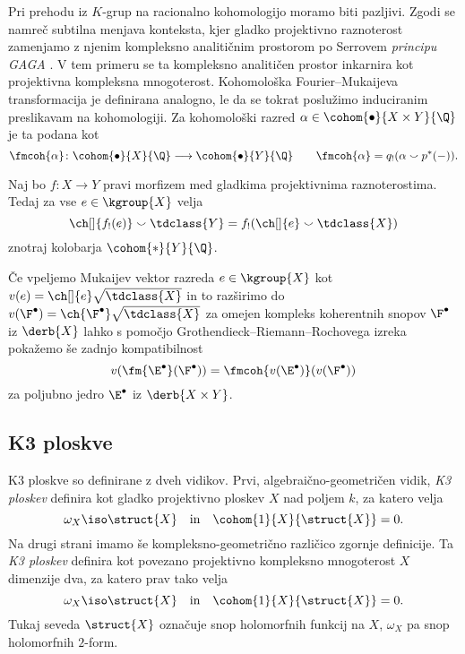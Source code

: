 Pri prehodu iz $K$-grup na racionalno kohomologijo moramo biti pazljivi. Zgodi se namreč subtilna menjava konteksta, kjer gladko projektivno raznoterost zamenjamo z njenim kompleksno analitičnim prostorom po Serrovem \emph{principu GAGA} \cite{Serre1956}. V tem primeru se ta kompleksno analitičen prostor inkarnira kot projektivna kompleksna mnogoterost. Kohomološka Fourier--Mukaijeva transformacija je definirana analogno, le da se tokrat poslužimo induciranim preslikavam na kohomologiji. Za kohomološki razred $\alpha \in \cohom{\bullet}{X \times Y}{\Q}$ je ta podana kot
\[
    \fmcoh{\alpha} \colon \cohom{\bullet}{X}{\Q} \longrightarrow \cohom{\bullet}{Y}{\Q} \qquad \fmcoh{\alpha} = q_!(\alpha \smallsmile p^*(-)).
\]

\begin{izrek}
    Naj bo $f \colon X \to Y$ pravi morfizem med gladkima projektivnima raznoterostima. Tedaj za vse $e \in \kgroup{X}$ velja
    \begin{equation}
        \ch[]{f_!(e)} \smallsmile \tdclass{Y} = f_!(\ch[]{e} \smallsmile \tdclass{X})
    \end{equation}
    znotraj kolobarja $\cohom{*}{Y}{\Q}$.
\end{izrek}

Če vpeljemo Mukaijev vektor razreda $e \in \kgroup{X}$ kot $v(e) = \ch[]{e}\sqrt{\tdclass{X}}$ in to razširimo do $v(\F^\bullet) = \ch{\F^\bullet}\sqrt{\tdclass{X}}$ za omejen kompleks koherentnih snopov $\F^\bullet$ iz $\derb{X}$ lahko s pomočjo Grothendieck--Riemann--Rochovega izreka pokažemo še zadnjo kompatibilnost
\[
    v(\fm{\E^\bullet}(\F^\bullet)) = \fmcoh{v(\E^\bullet)}(v(\F^\bullet))
\]
za poljubno jedro $\E^\bullet$ iz $\derb{X \times Y}$.

\subsection*{K3 ploskve}

K3 ploskve so definirane z dveh vidikov. Prvi, algebraično-geometričen vidik, \emph{K3 ploskev} definira kot gladko projektivno ploskev $X$ nad poljem $k$, za katero velja 
\[
    \omega_X \iso \struct{X} \quad \text{in} \quad \cohom{1}{X}{\struct{X}} = 0.
\]
Na drugi strani imamo še kompleksno-geometrično različico zgornje definicije. Ta \emph{K3 ploskev} definira kot povezano projektivno kompleksno mnogoterost $X$ dimenzije dva, za katero prav tako velja
\[
    \omega_X \iso \struct{X} \quad \text{in} \quad \cohom{1}{X}{\struct{X}} = 0.
\]
Tukaj seveda $\struct{X}$ označuje snop holomorfnih funkcij na $X$, $\omega_X$ pa snop holomorfnih $2$-form.

